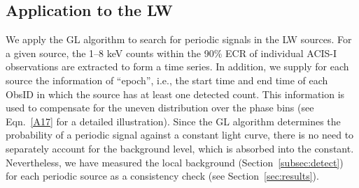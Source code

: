 \documentclass[fleqn,usenatbib]{mnras}
\begin{document}
\subsection{Application to the LW}\label{subsec:appli}
We apply the GL algorithm to search for periodic signals in the LW sources. 
For a given source, the 1--8 keV counts within the 90\% ECR of individual ACIS-I observations are extracted to form a time series.  
In addition, we supply for each source the information of ``epoch'', i.e., the start time and end time of each ObsID in which the source has at least one detected count. This information is used to compensate for the uneven distribution over the phase bins (see Eqn.~\ref{A17} for a detailed illustration). 
Since the GL algorithm determines the probability of a periodic signal against a constant light curve, there is no need to separately account for the background level, which is absorbed into the constant. 
Nevertheless, we have measured the local background (Section~\ref{subsec:detect}) for each periodic source as a consistency check (see Section~\ref{sec:results}). 
\end{document}
